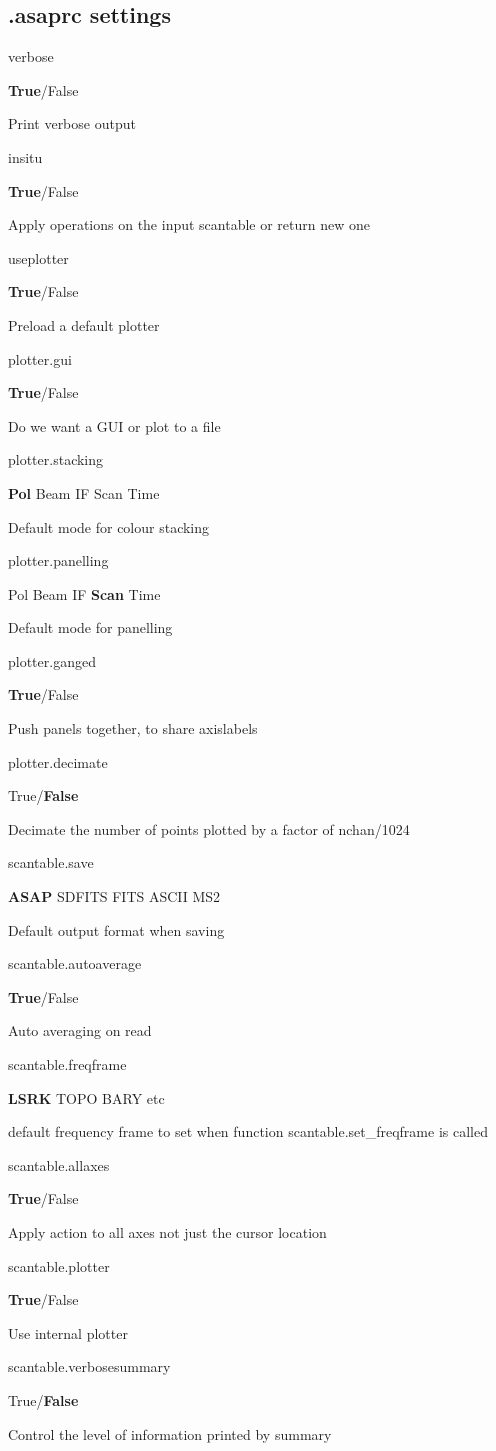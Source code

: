 \documentclass[11pt]{article}
\newcommand{\asaprc}[3]{
  \begin{minipage}[t]{45mm}#1\end{minipage}
  \begin{minipage}[t]{30mm}\raggedright #2\end{minipage}\hspace{3mm}
  \begin{minipage}[t]{\textwidth-75mm}#3\end{minipage}
}
\begin{document}
\subsection{.asaprc settings}

\asaprc{verbose}{{\bf True}/False}{Print verbose output}

\asaprc{insitu}{{\bf True}/False}{Apply operations on the input
scantable or return new one}


\asaprc{useplotter}{{\bf True}/False}{Preload a default plotter}

\asaprc{plotter.gui}{{\bf True}/False}{Do we want a GUI or plot to a
file}

\asaprc{plotter.stacking}{{\bf Pol} Beam IF Scan Time}{Default mode for
colour stacking}

\asaprc{plotter.panelling}{Pol Beam IF {\bf Scan} Time}{Default mode
for panelling}

\asaprc{plotter.ganged}{{\bf True}/False}{Push panels together, to
share axislabels}

\asaprc{plotter.decimate}{True/{\bf False}}{Decimate the number of
points plotted by a factor of nchan/1024}


\asaprc{scantable.save}{{\bf ASAP} SDFITS FITS ASCII MS2}{Default output
format when saving} 

\asaprc{scantable.autoaverage}{{\bf True}/False}{Auto averaging on
read}

\asaprc{scantable.freqframe}{{\bf LSRK} TOPO BARY etc}{default
frequency frame to set when function scantable.set\_freqframe is
called}

\asaprc{scantable.allaxes}{{\bf True}/False}{Apply action to all axes
not just the cursor location}

\asaprc{scantable.plotter}{{\bf True}/False}{Use internal plotter}

\asaprc{scantable.verbosesummary}{True/{\bf False}}{Control the level
of information printed by summary}
\end{document}
